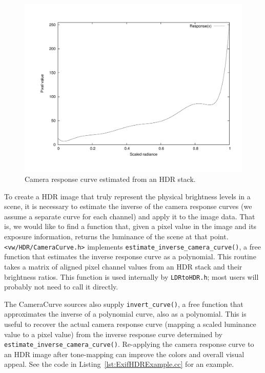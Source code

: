 \begin{figure}[tbp]
\begin{center}
  \includegraphics[width=5in]{images/hdr_response.pdf}
 \end{center}
  \caption{Camera response curve estimated from an HDR stack.}
  \label{fig:hdr_camera_curve}
\end{figure}

To create a HDR image that truly represent the physical brightness
levels in a scene, it is necessary to estimate the inverse of the
camera response curves (we assume a separate curve for each channel)
and apply it to the image data.  That is, we would like to find a
function that, given a pixel value in the image and its exposure
information, returns the luminance of the scene at that point.
\verb#<vw/HDR/CameraCurve.h># implements
\verb#estimate_inverse_camera_curve()#, a free function that estimates
the inverse response curve as a polynomial.  This routine takes a
matrix of aligned pixel channel values from an HDR stack and their
brightness ratios. This function is used internally by
\verb#LDRtoHDR.h#; most users will probably not need to call it
directly.

The CameraCurve sources also supply \verb#invert_curve()#, a free
function that approximates the inverse of a polynomial curve, also as
a polynomial. This is useful to recover the actual camera response
curve (mapping a scaled luminance value to a pixel value) from the
inverse response curve determined by
\verb#estimate_inverse_camera_curve()#. Re-applying the camera
response curve to an HDR image after tone-mapping can improve the
colors and overall visual appeal. See the code in
Listing~\ref{lst:ExifHDRExample.cc} for an example.

